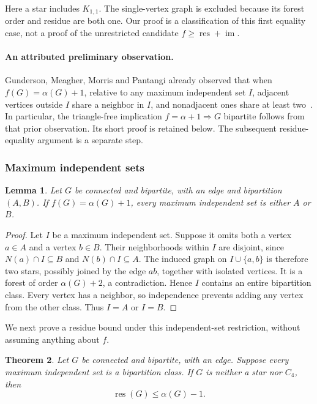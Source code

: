 \documentclass[11pt,a4paper]{article}
\newtheorem{theorem}{Theorem}[section]
\newtheorem{lemma}[theorem]{Lemma}
\theoremstyle{definition}\newtheorem{definition}[theorem]{Definition}
\theoremstyle{remark}\newtheorem{remark}[theorem]{Remark}
\newcommand{\res}{\operatorname{res}}
\newcommand{\im}{\operatorname{im}}
\begin{document}
Here a star includes $K_{1,1}$. The single-vertex graph is excluded because
its forest order and residue are both one. Our proof is a classification
of this first equality case, not a proof of the unrestricted candidate
$f\ge\res+\im$.

\paragraph{An attributed preliminary observation.}
Gunderson, Meagher, Morris and Pantangi already observed that when
\(f(G)=\alpha(G)+1\), relative to any maximum independent set \(I\),
adjacent vertices outside \(I\) share a neighbor in \(I\), and nonadjacent
ones share at least two~\cite[Section 5]{late:Gunderson}. In particular,
the triangle-free implication \(f=\alpha+1\Rightarrow G\) bipartite follows
from that prior observation. Its short proof is retained below.
The subsequent residue-equality argument is a separate step.

\subsubsection{Maximum independent sets}
\begin{lemma}\label{late:equality:lem:sides}
Let $G$ be connected and bipartite, with an edge and bipartition $(A,B)$.
If $f(G)=\alpha(G)+1$, every maximum independent set is either $A$ or $B$.
\end{lemma}
\begin{proof}
Let $I$ be a maximum independent set. Suppose it omits both a vertex
$a\in A$ and a vertex $b\in B$. Their neighborhoods within $I$ are
disjoint, since $N(a)\cap I\subseteq B$ and $N(b)\cap I\subseteq A$.
The induced graph on $I\cup\{a,b\}$ is therefore two stars, possibly
joined by the edge $ab$, together with isolated vertices. It is a forest
of order $\alpha(G)+2$, a contradiction. Hence $I$ contains an entire
bipartition class. Every vertex has a neighbor, so independence prevents
adding any vertex from the other class. Thus $I=A$ or $I=B$.
\end{proof}

We next prove a residue bound under this independent-set restriction,
without assuming anything about $f$.
\begin{theorem}\label{late:equality:thm:strict}
Let $G$ be connected and bipartite, with an edge. Suppose every maximum
independent set is a bipartition class. If $G$ is neither a star nor $C_4$,
then
\[
 \res(G)\le\alpha(G)-1.
\]
\end{theorem}
\end{document}
